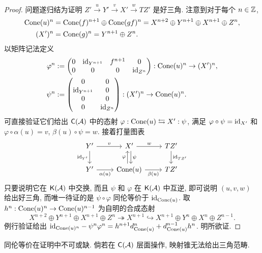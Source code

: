 \begin{proof}
	问题遂归结为证明 $Z' \xrightarrow{u} Y' \xrightarrow{v} X' \xrightarrow{w} TZ'$ 是好三角. 注意到对于每个 $n \in \mathbb{Z}$,
	\begin{align*}
		\operatorname{Cone}(u)^n & = \operatorname{Cone}(f)^{n+1} \oplus \operatorname{Cone}(gf)^n = X^{n+2} \oplus Y^{n+1} \oplus X^{n+1} \oplus Z^n , \\
		(X')^n & = \operatorname{Cone}(g)^n = Y^{n+1} \oplus Z^n .
	\end{align*}
	以矩阵记法定义
	\begin{align*}
		\varphi^n & := \begin{pmatrix} 0 & \mathrm{id}_{Y^{n+1}} & f^{n+1} & 0 \\ 0 & 0 & 0 & \mathrm{id}_{Z^n} \end{pmatrix} : \operatorname{Cone}(u)^n \to (X')^n , \\
		\psi^n & := \begin{pmatrix} 0 & 0 \\ \mathrm{id}_{Y^{n+1}} & 0 \\ 0 & 0 \\ 0 & \mathrm{id}_{Z^n} \end{pmatrix} : (X')^n \to \operatorname{Cone}(u)^n .
	\end{align*}
	可直接验证它们给出 $\mathsf{C}(\mathcal{A})$ 中的态射 $\varphi: \operatorname{Cone}(u) \leftrightarrows X' : \psi$, 满足 $\varphi \circ \psi = \mathrm{id}_{X'}$ 和 $\varphi \circ \alpha(u) = v$, $\beta(u) \circ \psi = w$. 接着打量图表 
	\[\begin{tikzcd}
		Y' \arrow[r, "v"] \arrow[d, "\identity_{Y'}"'] & X' \arrow[r, "w"] \arrow[shift left, d, "\psi"] & TZ' \arrow[d, "\identity_{TZ'}"] \\
		Y' \arrow[r, "\alpha(u)"'] & \Cone(u) \arrow[r, "\beta(u)"'] \arrow[shift left, u, "\varphi"] & TZ'
	\end{tikzcd}\]
	只要说明它在 $\mathsf{K}(\mathcal{A})$ 中交换, 而且 $\psi$ 和 $\varphi$ 在 $\mathsf{K}(\mathcal{A})$ 中互逆, 即可说明 $(u, v, w)$ 给出好三角, 而唯一待证的是 $\psi \circ \varphi$ 同伦等价于 $\mathrm{id}_{\operatorname{Cone}(u)}$. 取 $h^n : \operatorname{Cone}(u)^n \to \operatorname{Cone}(u)^{n-1}$ 为自明的合成态射
	\[ X^{n+2} \oplus Y^{n+1} \oplus X^{n+1} \oplus Z^n \twoheadrightarrow X^{n+1} \hookrightarrow X^{n+1} \oplus Y^n \oplus X^n \oplus Z^{n-1}. \]
	例行验证给出 $\mathrm{id}_{\operatorname{Cone}(u)^n} - \psi^n \varphi^n = h^{n+1} d_{\operatorname{Cone}(u)}^n + d_{\operatorname{Cone}(u)}^{n-1} h^n$. 明所欲证.
\end{proof}

同伦等价在证明中不可或缺. 倘若在 $\mathsf{C}(\mathcal{A})$ 层面操作, 映射锥无法给出三角范畴.


